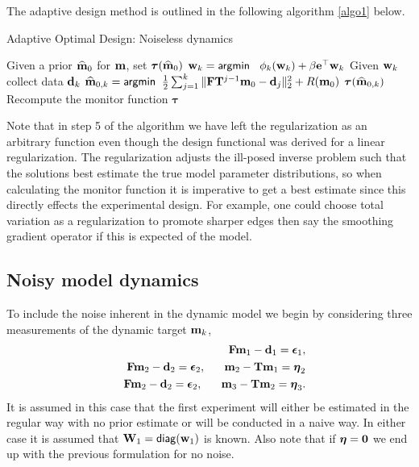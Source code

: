 \documentclass[11pt]{article}
\newcommand{\bfF}	{{\bf{F}}}
\newcommand{\bfI}	{{\bf{I}}}
\newcommand{\bfT}	{{\bf{T}}}
\newcommand{\bfW}	{{\bf{W}}}
\newcommand{\bfd}	{{\bf{d}}}
\newcommand{\bfe}	{{\bf{e}}}
\newcommand{\bfm}	{{\bf{m}}}
\newcommand{\bfw}	{{\bf{w}}}
\newcommand{\hf}        {{\frac 12}}
\newcommand{\bfepsilon} {{\boldsymbol \epsilon}}
\newcommand{\bfeta}     {{\boldsymbol \eta}}
\newcommand{\bftau}      {{\boldsymbol \tau}}
\newcommand{\bfmhat}    {{\widehat{\bfm}}}
\newcommand {\zero}  { {\bf 0} }
\renewcommand{\hf}		 {\frac12}
\renewcommand{\bfmhat}	{\widehat{\bf m}}
\begin{document}
{\bigskip
The adaptive design method is outlined in the following algorithm \ref{algo1} below.
\begin{algorithm}
\caption{Adaptive Optimal Design: Noiseless dynamics}\label{algo1}
\begin{algorithmic}[1]
\State Given a prior $\bfmhat_{0}$  for $\bfm$, set $\bftau(\bfmhat_0)$
\Comment{if there is no prior, $\bftau = \bfI$}
\State $\bfw_{k} = {\sf argmin }\;\;\ \phi_k(\bfw_k) + \beta\bfe^{\top}\bfw_k$  
\State Given $\bfw_k$ collect data $\bfd_k$
%
\State $\bfmhat_{0,k} ={\sf argmin } \;\; \hf  \sum_{j=1}^{k}\| \bfF\bfT^{j-1}\bfm_0 - \bfd_j \|^2_2 + R(\bfm_0)$
\Comment {re-estimate $\bfm_0$ }
\State $\bftau(\bfmhat_{0,k})$
\Comment Recompute the monitor function $\bftau$
\EndFor
\end{algorithmic}
\end{algorithm}
Note that in step 5 of the algorithm we have left the regularization as an arbitrary function even though the design functional was derived for a linear regularization. The regularization adjusts the ill-posed inverse problem such that the solutions best estimate the true model parameter distributions, so when calculating the monitor function it is imperative to get a best estimate since this directly effects the experimental design. For example, one could choose total variation as a regularization to promote sharper edges then say the smoothing gradient operator if this is expected of the model. 
\subsection{Noisy model dynamics}
\label{Kalman}
To include the noise inherent in the dynamic model we begin by  considering three measurements of the dynamic target $\bfm_k$,
\begin{eqnarray*}
\label{eq:noisy}
&&\bfF\bfm_{1} - \bfd_1 = \bfepsilon_1,\\
&&\bfF\bfm_{2} - \bfd_2 = \bfepsilon_2, \;\;\;\;\;\; \bfm_2 -\bfT\bfm_1 = \bfeta_2 \\
&&\bfF\bfm_{2} - \bfd_2 = \bfepsilon_2, \;\;\;\;\;\; \bfm_3 -\bfT\bfm_2 = \bfeta_3.
\end{eqnarray*} 
It is assumed in this case that the first experiment will either be estimated in the regular way with no prior estimate or will be conducted in a naive way. In either case it is assumed that $\bfW_1 = {\sf diag}(\bfw_1)$ is known. Also note that if $\bfeta = \zero$ we end up with the previous formulation for no noise. 

}
\end{document}
